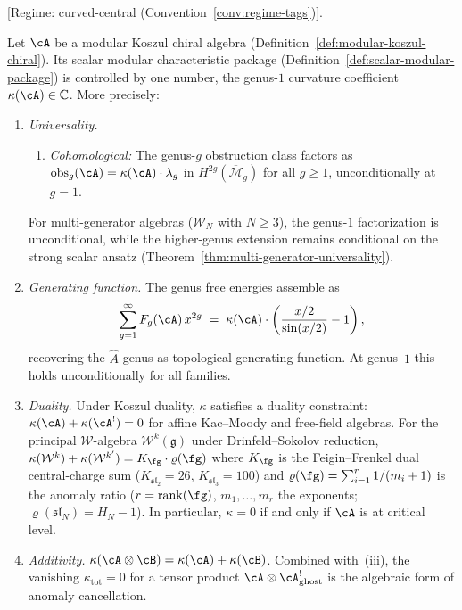\begin{theorem}
\label{thm:modular-characteristic}
\textup{[}Regime: curved-central
\textup{(}Convention~\textup{\ref{conv:regime-tags})].}

Let $\cA$ be a modular Koszul chiral algebra
(Definition~\ref{def:modular-koszul-chiral}).  Its scalar modular
characteristic package
(Definition~\ref{def:scalar-modular-package}) is controlled by one
number, the genus-$1$ curvature coefficient
$\kappa(\cA) \in \mathbb{C}$.  More precisely:

\begin{enumerate}[label=\textup{(\roman*)}]
\item \emph{Universality.}
  \begin{enumerate}[label=\textup{(\alph*)}]
  \item \emph{Cohomological\textup{:}} The genus-$g$ obstruction class
  factors as
  $\mathrm{obs}_g(\cA) = \kappa(\cA) \cdot \lambda_g$
  in $H^{2g}(\overline{\mathcal{M}}_g)$ for all $g \geq 1$,
  unconditionally at $g = 1$.
  \end{enumerate}
  For multi-generator algebras \textup{(}$\mathcal{W}_N$ with
  $N \geq 3$\textup{)}, the genus-$1$ factorization is unconditional,
  while the higher-genus extension remains conditional on the
  strong scalar ansatz
  \textup{(}Theorem~\textup{\ref{thm:multi-generator-universality})}.
\item \emph{Generating function.}
  The genus free energies
  assemble as
  \begin{equation}\label{eq:modular-char-gf}
  \sum_{g=1}^{\infty} F_g(\cA)\, x^{2g}
  \;=\; \kappa(\cA) \cdot
  \left(\frac{x/2}{\sin(x/2)} - 1\right),
  \end{equation}
  recovering the $\hat{A}$-genus as topological generating function.
  At genus~$1$ this holds unconditionally for all families.
\item \emph{Duality.}
  Under Koszul duality, $\kappa$ satisfies a duality constraint:
  $\kappa(\cA) + \kappa(\cA^!) = 0$ for affine Kac--Moody and
  free-field algebras.  For the principal $\mathcal{W}$-algebra
  $\mathcal{W}^k(\mathfrak{g})$ under Drinfeld--Sokolov reduction,
  $\kappa(\mathcal{W}^k) + \kappa(\mathcal{W}^{k'}) =
  K_\fg \cdot \varrho(\fg)$
  where $K_\fg$ is the Feigin--Frenkel dual central-charge sum
  \textup{(}$K_{\mathfrak{sl}_2} = 26$,
  $K_{\mathfrak{sl}_3} = 100$\textup{)} and
  $\varrho(\fg) = \sum_{i=1}^{r} 1/(m_i + 1)$ is the anomaly
  ratio \textup{(}$r = \operatorname{rank}(\fg)$,
  $m_1, \ldots, m_r$ the exponents;
  $\varrho(\mathfrak{sl}_N) = H_N - 1$\textup{)}.
  In particular, $\kappa = 0$ if and only if $\cA$ is at critical level.
\item \emph{Additivity.}
  $\kappa(\cA \otimes \cB) = \kappa(\cA) + \kappa(\cB)$.
  Combined with~(iii), the vanishing
  $\kappa_{\mathrm{tot}} = 0$ for a tensor product
  $\cA \otimes \cA^!_{\mathrm{ghost}}$ is the algebraic
  form of anomaly cancellation.
\end{enumerate}
\end{theorem}

